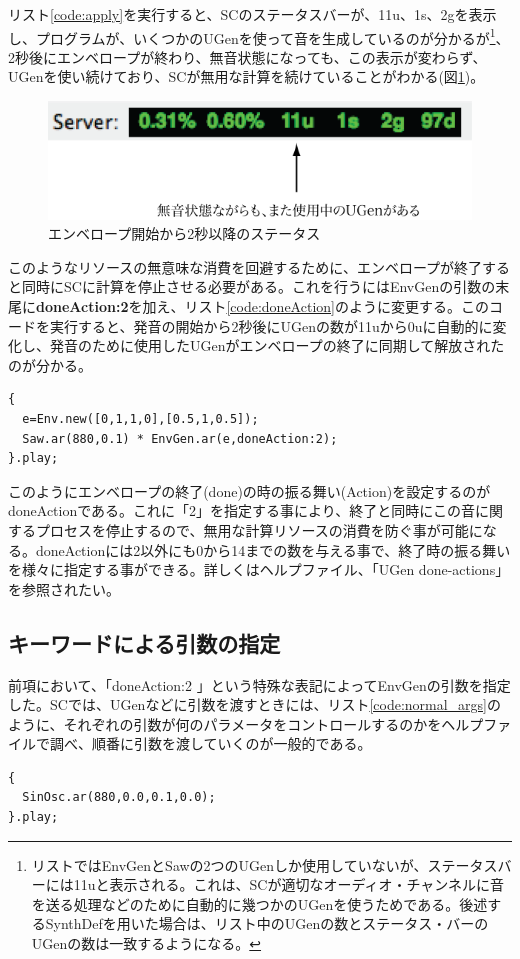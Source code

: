 \documentclass{jsarticle}
\begin{document}
リスト\ref{code:apply}を実行すると、SCのステータスバーが、11u、1s、2gを表示し、プログラムが、いくつかのUGenを使って音を生成しているのが分かるが\footnote{リストではEnvGenとSawの2つのUGenしか使用していないが、ステータスバーには11uと表示される。これは、SCが適切なオーディオ・チャンネルに音を送る処理などのために自動的に幾つかのUGenを使うためである。後述するSynthDefを用いた場合は、リスト中のUGenの数とステータス・バーのUGenの数は一致するようになる。}、2秒後にエンベロープが終わり、無音状態になっても、この表示が変わらず、UGenを使い続けており、SCが無用な計算を続けていることがわかる(図\ref{fig:status})。

\begin{figure}[htbp]
 \begin{center}
  \includegraphics[scale=0.8]{status_comment.pdf}
 \end{center}
 \caption{エンベロープ開始から2秒以降のステータス}
 \label{fig:status}
\end{figure}

このようなリソースの無意味な消費を回避するために、エンベロープが終了すると同時にSCに計算を停止させる必要がある。これを行うにはEnvGenの引数の末尾に{\bf doneAction:2}を加え、リスト\ref{code:doneAction}のように変更する。このコードを実行すると、発音の開始から2秒後にUGenの数が11uから0uに自動的に変化し、発音のために使用したUGenがエンベロープの終了に同期して解放されたのが分かる。

 \begin{lstlisting}[caption=doneActionを指定,label=code:doneAction]
{
  e=Env.new([0,1,1,0],[0.5,1,0.5]);
  Saw.ar(880,0.1) * EnvGen.ar(e,doneAction:2);
}.play;
\end{lstlisting}

このようにエンベロープの終了(done)の時の振る舞い(Action)を設定するのがdoneActionである。これに「2」を指定する事により、終了と同時にこの音に関するプロセスを停止するので、無用な計算リソースの消費を防ぐ事が可能になる。doneActionには2以外にも0から14までの数を与える事で、終了時の振る舞いを様々に指定する事ができる。詳しくはヘルプファイル、「UGen done-actions」を参照されたい。

\subsection{キーワードによる引数の指定}
前項において、「doneAction:2 」という特殊な表記によってEnvGenの引数を指定した。SCでは、UGenなどに引数を渡すときには、リスト\ref{code:normal_args}のように、それぞれの引数が何のパラメータをコントロールするのかをヘルプファイルで調べ、順番に引数を渡していくのが一般的である。
\begin{lstlisting}[caption=一般的な引数の指定,label=code:normal_args]
{
  SinOsc.ar(880,0.0,0.1,0.0);
}.play;
\end{lstlisting}
\end{document}

